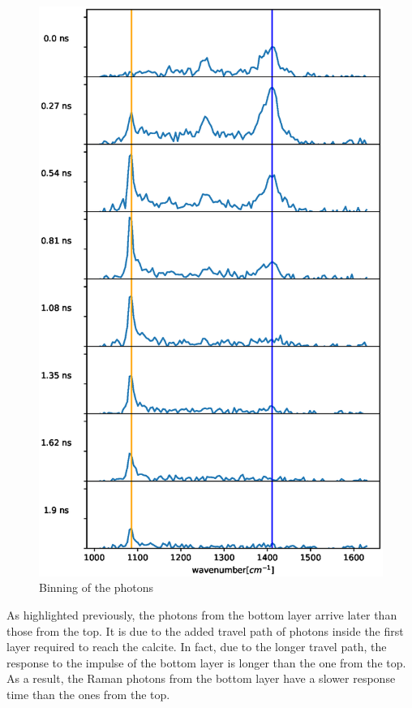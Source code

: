 \documentclass{osa-article}
\begin{document}
\begin{figure}
    \centering
    \includegraphics[scale = 0.4]{figure/multi8_time.eps}
    \caption{Binning of the photons}
    \label{fig:multi_time}
\end{figure}

As highlighted previously, the photons from the bottom layer arrive later than those from the top. It is due to the added travel path of photons inside the first layer required to reach the calcite. In fact, due to the longer travel path, the response to the impulse of the bottom layer is longer than the one from the top. As a result, the Raman photons from the bottom layer have a slower response time than the ones from the top.
\end{document}

